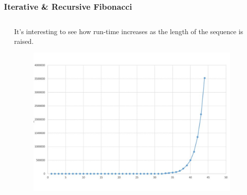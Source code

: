\begin{frame}[fragile]
\frametitle{Iterative \& Recursive Fibonacci}
\begin{columns}[T]

\begin{column}{0.50\textwidth}

\end{column}

\pause
\begin{column}{0.40\textwidth}
It's interesting to see how run-time increases as the length of the sequence is raised.
\begin{figure}[h]
\centerline{
\includegraphics[scale=0.25]{../Images/fib_timer.pdf}
}
\end{figure}
\end{column}

\end{columns}
\end{frame}


